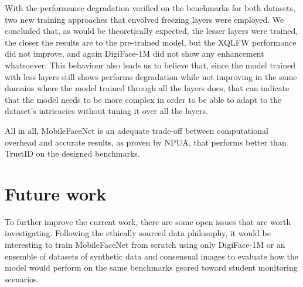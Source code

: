 \documentclass[class=report, crop=false, a4paper, 12pt]{standalone}
\begin{document}
\par With the performance degradation verified on the benchmarks for both datasets, two new training approaches that envolved freezing layers were employed. We concluded that, as would be theoretically expected, the lesser layers were trained, the closer the results are to the pre-trained model, but the XQLFW performance did not improve, and again DigiFace-1M did not show any enhancement whatsoever. This behaviour also leads us to believe that, since the model trained with less layers still shows performs degradation while not improving in the same domains where the model trained through all the layers does, that can indicate that the model needs to be more complex in order to be able to adapt to the dataset's intricacies without tuning it over all the layers.

\par All in all, MobileFaceNet is an adequate trade-off between computational overhead and accurate results, as proven by NPUA, that performs better than TrustID on the designed benchmarks. 

\section{Future work}
To further improve the current work, there are some open issues that are worth investigating. Following the ethically sourced data philosophy, it would be interesting to train MobileFaceNet from scratch using only DigiFace-1M or an ensemble of datasets of synthetic data and consensual images to evaluate how the model would perform on the same benchmarks geared toward student monitoring scenarios. 
\end{document}
